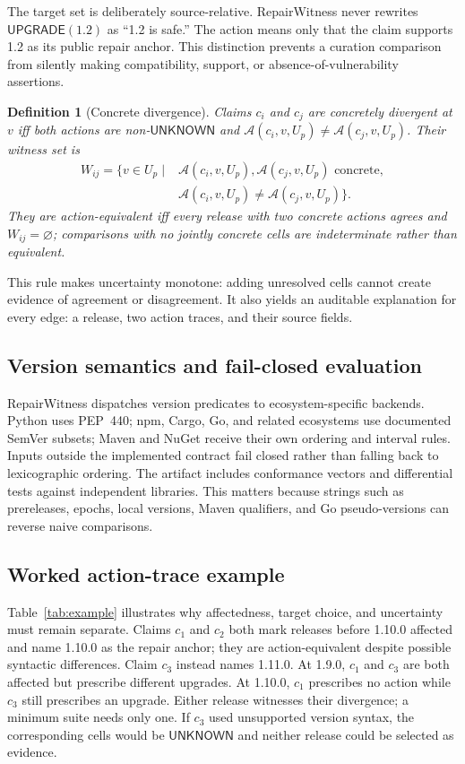 \documentclass[10pt,conference]{IEEEtran}
\newtheorem{definition}{Definition}
\newcommand{\Act}{\mathcal{A}}
\newcommand{\unknown}{\ensuremath{\mathsf{UNKNOWN}}}
\newcommand{\upgrade}{\ensuremath{\mathsf{UPGRADE}}}
\begin{document}
The target set is deliberately source-relative. RepairWitness never rewrites $\upgrade(1.2)$ as ``1.2 is safe.'' The action means only that the claim supports 1.2 as its public repair anchor. This distinction prevents a curation comparison from silently making compatibility, support, or absence-of-vulnerability assertions.

\begin{definition}[Concrete divergence]
Claims $c_i$ and $c_j$ are concretely divergent at $v$ iff both actions are non-\unknown{} and $\Act(c_i,v,U_p)\neq\Act(c_j,v,U_p)$. Their witness set is
\[
\begin{aligned}
W_{ij}=\{v\in U_p\mid{}&\Act(c_i,v,U_p),\Act(c_j,v,U_p)\text{ concrete},\\
&\Act(c_i,v,U_p)\neq\Act(c_j,v,U_p)\}.
\end{aligned}
\]
They are action-equivalent iff every release with two concrete actions agrees and $W_{ij}=\varnothing$; comparisons with no jointly concrete cells are indeterminate rather than equivalent.
\end{definition}

This rule makes uncertainty monotone: adding unresolved cells cannot create evidence of agreement or disagreement. It also yields an auditable explanation for every edge: a release, two action traces, and their source fields.

\subsection{Version semantics and fail-closed evaluation}
RepairWitness dispatches version predicates to ecosystem-specific backends. Python uses PEP~440; npm, Cargo, Go, and related ecosystems use documented SemVer subsets; Maven and NuGet receive their own ordering and interval rules. Inputs outside the implemented contract fail closed rather than falling back to lexicographic ordering. The artifact includes conformance vectors and differential tests against independent libraries. This matters because strings such as prereleases, epochs, local versions, Maven qualifiers, and Go pseudo-versions can reverse naive comparisons.


\subsection{Worked action-trace example}
Table~\ref{tab:example} illustrates why affectedness, target choice, and uncertainty must remain separate. Claims $c_1$ and $c_2$ both mark releases before 1.10.0 affected and name 1.10.0 as the repair anchor; they are action-equivalent despite possible syntactic differences. Claim $c_3$ instead names 1.11.0. At 1.9.0, $c_1$ and $c_3$ are both affected but prescribe different upgrades. At 1.10.0, $c_1$ prescribes no action while $c_3$ still prescribes an upgrade. Either release witnesses their divergence; a minimum suite needs only one. If $c_3$ used unsupported version syntax, the corresponding cells would be \unknown{} and neither release could be selected as evidence.
\end{document}
